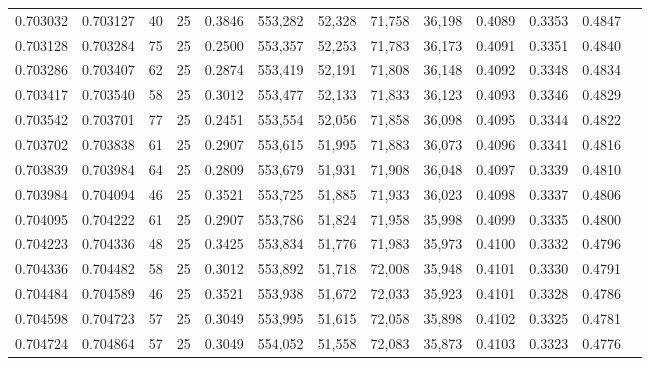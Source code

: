 \begin{tabular}{rrrrrrrrrrrrr}
0.703032 & 0.703127 &    40 &  25 &                                     0.3846 & 553,282 &  52,328 &  71,758 &  36,198 & 0.4089 & 0.3353 & 0.4847 \\
0.703128 & 0.703284 &    75 &  25 &                                     0.2500 & 553,357 &  52,253 &  71,783 &  36,173 & 0.4091 & 0.3351 & 0.4840 \\
0.703286 & 0.703407 &    62 &  25 &                                     0.2874 & 553,419 &  52,191 &  71,808 &  36,148 & 0.4092 & 0.3348 & 0.4834 \\
0.703417 & 0.703540 &    58 &  25 &                                     0.3012 & 553,477 &  52,133 &  71,833 &  36,123 & 0.4093 & 0.3346 & 0.4829 \\
0.703542 & 0.703701 &    77 &  25 &                                     0.2451 & 553,554 &  52,056 &  71,858 &  36,098 & 0.4095 & 0.3344 & 0.4822 \\
0.703702 & 0.703838 &    61 &  25 &                                     0.2907 & 553,615 &  51,995 &  71,883 &  36,073 & 0.4096 & 0.3341 & 0.4816 \\
0.703839 & 0.703984 &    64 &  25 &                                     0.2809 & 553,679 &  51,931 &  71,908 &  36,048 & 0.4097 & 0.3339 & 0.4810 \\
0.703984 & 0.704094 &    46 &  25 &                                     0.3521 & 553,725 &  51,885 &  71,933 &  36,023 & 0.4098 & 0.3337 & 0.4806 \\
0.704095 & 0.704222 &    61 &  25 &                                     0.2907 & 553,786 &  51,824 &  71,958 &  35,998 & 0.4099 & 0.3335 & 0.4800 \\
0.704223 & 0.704336 &    48 &  25 &                                     0.3425 & 553,834 &  51,776 &  71,983 &  35,973 & 0.4100 & 0.3332 & 0.4796 \\
0.704336 & 0.704482 &    58 &  25 &                                     0.3012 & 553,892 &  51,718 &  72,008 &  35,948 & 0.4101 & 0.3330 & 0.4791 \\
0.704484 & 0.704589 &    46 &  25 &                                     0.3521 & 553,938 &  51,672 &  72,033 &  35,923 & 0.4101 & 0.3328 & 0.4786 \\
0.704598 & 0.704723 &    57 &  25 &                                     0.3049 & 553,995 &  51,615 &  72,058 &  35,898 & 0.4102 & 0.3325 & 0.4781 \\
0.704724 & 0.704864 &    57 &  25 &                                     0.3049 & 554,052 &  51,558 &  72,083 &  35,873 & 0.4103 & 0.3323 & 0.4776 \\

\end{tabular}
